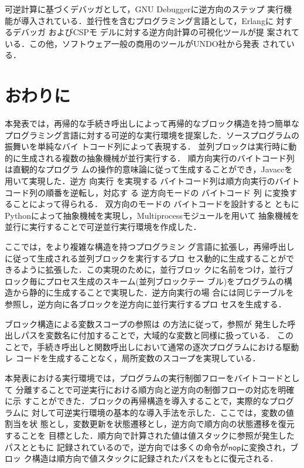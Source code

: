 \documentclass[submit,PRO]{ipsj}
\newcommand{\bcode}[1]{$\mathsf{#1}$}
\begin{document}
可逆計算に基づくデバッガとして，GNU Debugger\cite{GDB}に逆方向のステップ
実行機能が導入されている．並行性を含むプログラミング言語として，Erlangに
対するデバッガ
\cite{DBLP:conf/flops/Lanese0PV18,DBLP:conf/forte/LanesePV19}およびCSPモ
デルに対する逆方向計算の可視化ツール\cite{DBLP:conf/rc/Galindo0ST20}が提
案されている．この他，ソフトウェア一般の商用のツールがUNDO社から発表
\cite{UNDODebugger}されている．

\section{おわりに}

本発表では，再帰的な手続き呼出しによって再帰的なブロック構造を持つ簡単な
プログラミング言語に対する可逆的な実行環境を提案した．ソースプログラムの
振舞いを単純なバイ
トコード列によって表現する．
並列ブロックは実行時に動的に生成される複数の抽象機械が並行実行する．
順方向実行のバイトコード列は直観的なプログラ
ムの操作的意味論に従って生成することができ，Javaccを用いて実現した．逆方
向実行%
を実現する%
バイトコード列は順方向実行のバイトコード列の順番を逆転し，対応す
る%
逆方向モードの%
バイトコード%
列%
に変換することによって得られる．%
双方向のモードの%
バイトコードを設計すると
ともにPythonによって抽象機械を実現し，Multiprocessモジュールを用いて
抽象機械を並行に実行することで可逆並行実行環境を作成した．

ここでは，\cite{DBLP:conf/rc/IkedaY20}をより複雑な構造を持つプログラミン
グ言語に拡張し，再帰呼出しに従って生成される並列ブロックを実行するプロ
セス動的に生成することができるように拡張した．この実現のために，並行ブロッ
クに名前をつけ，並行ブロック毎にプロセス生成のスキーム(並列ブロックテー
ブル)をプログラムの構造から静的に生成することで実現した．逆方向実行の場
合には同じテーブルを参照し，逆方向に各ブロックを逆方向に並行実行するプロ
セスを生成する．

ブロック構造による変数スコープの参照は
\cite{DBLP:journals/corr/abs-1808-08651,Hoey20PHD}の方法に従って，参照が
発生した呼出しパスを変数名に付加することで，大域的な変数と同様に扱っている．
このことで，手続き呼出しと関数呼出しにおいて通常の逐次プログラムにおける駆動レ
コードを生成することなく，局所変数のスコープを実現している．

本発表における実行環境では，プログラムの実行制御フローをバイトコードとして
分離することで可逆実行における順方向と逆方向の制御フローの対応を明確に示
すことができた．ブロックの再帰構造を導入することで，実際的なプログラムに
対して可逆実行環境の基本的な導入手法を示した．ここでは，変数の値割当を状
態とし，変数更新を状態遷移とし，逆方向で順方向の状態遷移を復元することを
目標とした．順方向で計算された値は値スタックに参照が発生したパスとともに
記録されているので，逆方向では多くの命令が\bcode{nop}に変換され，ブロッ
ク構造は順方向で値スタックに記録されたパスをもとに復元される．
\end{document}
